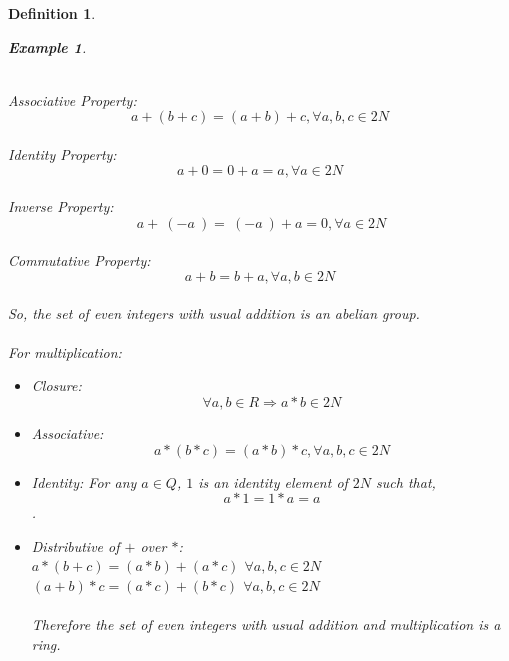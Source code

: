 \documentclass{article}
\newtheorem{defn}{Definition} [section]
\newtheorem{ex}{Example}[section]
\begin{document}
\begin{defn}
\begin{ex}
\begin{enumerate}
	\\Associative Property: $$a+(b+c)=(a+b)+c, \forall a,b,c \in 2N$$
	\\Identity Property: $$a+0=0+a=a, \forall a \in 2N$$
	\\Inverse Property: $$ \ a + \ (-a\ ) =\ (-a\ ) + a = 0, \forall a \in 2N$$
	\\Commutative Property: $$a+b=b+a,\forall a,b \in 2N$$
	\\So, the set of even integers with usual addition is an abelian group.\\
	\\For multiplication:
	\begin{itemize}
	    \item Closure: $$\forall a, b \in R \Rightarrow a*b \in 2N$$
        \item Associative: $$a*(b*c)=(a*b)*c, \forall a,b,c \in 2N$$
	    \item Identity: For any $a \in Q$, $1$ is an identity element of $2N$ such that, $$a*1=1*a=a$$ .
		\item Distributive of $+$ over $*$:\\
	        $a*(b+c)=(a*b)+ (a*c)$  $ \forall a,b,c \in 2N $ \\
	        $(a+b)*c=(a*c)+(b*c)$   $ \forall a,b,c \in 2N $ \\
	    \\Therefore the set of even integers with usual addition and multiplication is a ring.
    \end{itemize}	
\end{enumerate}
\end{ex}
\end{defn}
\end{document}
